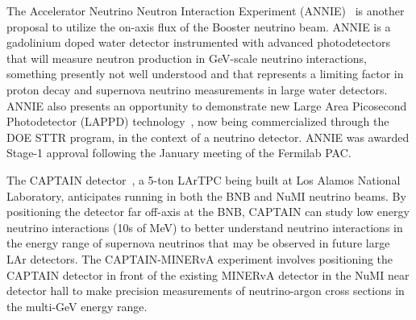 The Accelerator Neutrino Neutron Interaction Experiment
(ANNIE)~\cite{Anghel:2014ynd} is another proposal to utilize the
on-axis flux of the Booster neutrino beam.  ANNIE is a gadolinium
doped water detector instrumented with advanced photodetectors that
will measure neutron production in GeV-scale neutrino interactions,
something presently not well understood and that represents a limiting
factor in proton decay and supernova neutrino measurements in large
water detectors.  ANNIE also presents an opportunity to demonstrate
new Large Area Picosecond Photodetector (LAPPD)
technology~\cite{lappd}, now being commercialized through the DOE STTR
program, in the context of a neutrino detector. ANNIE was awarded
Stage-1 approval following the January meeting of the Fermilab PAC.


The CAPTAIN detector~\cite{Berns:2013usa}, a 5-ton LArTPC being built
at Los Alamos National Laboratory, anticipates running in both the BNB
and NuMI neutrino beams.  By positioning the detector far off-axis at
the BNB, CAPTAIN can study low energy neutrino interactions (10s of
MeV) to better understand neutrino interactions in the energy range of
supernova neutrinos that may be observed in future large LAr
detectors.  The CAPTAIN-MINERvA experiment involves positioning the
CAPTAIN detector in front of the existing MINERvA detector in the NuMI
near detector hall to make precision measurements of neutrino-argon
cross sections in the multi-GeV energy range.


